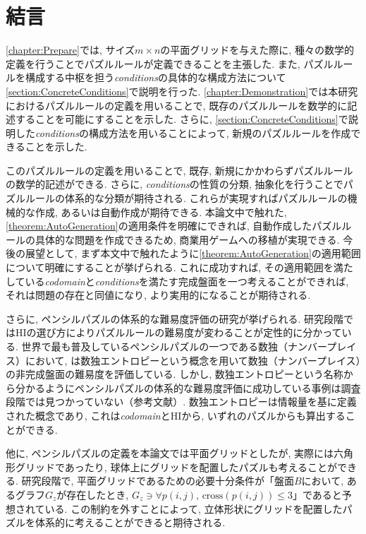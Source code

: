\chapter{結言}
\cref{chapter:Prepare}では, サイズ$m\times n$の平面グリッドを与えた際に, 種々の数学的定義を行うことでパズルルールが定義できることを主張した. また, パズルルールを構成する中枢を担う\textit{conditions}の具体的な構成方法について\cref{section:ConcreteConditions}で説明を行った. \cref{chapter:Demonstration}では本研究におけるパズルルールの定義を用いることで, 既存のパズルルールを数学的に記述することを可能にすることを示した. さらに, \cref{section:ConcreteConditions}で説明した\textit{conditions}の構成方法を用いることによって, 新規のパズルルールを作成できることを示した.

このパズルルールの定義を用いることで, 既存, 新規にかかわらずパズルルールの数学的記述ができる. さらに, \textit{conditions}の性質の分類, 抽象化を行うことでパズルルールの体系的な分類が期待される. これらが実現すればパズルルールの機械的な作成, あるいは自動作成が期待できる. 本論文中で触れた, \cref{theorem:AutoGeneration}の適用条件を明確にできれば, 自動作成したパズルルールの具体的な問題を作成できるため, 商業用ゲームへの移植が実現できる.
今後の展望として, まず本文中で触れたように\cref{theorem:AutoGeneration}の適用範囲について明確にすることが挙げられる. これに成功すれば, その適用範囲を満たしている\textit{codomain}と\textit{conditions}を満たす完成盤面を一つ考えることができれば, それは問題の存在と同値になり, より実用的になることが期待される.

さらに, ペンシルパズルの体系的な難易度評価の研究が挙げられる. 研究段階ではHIの選び方によりパズルルールの難易度が変わることが定性的に分かっている. 世界で最も普及しているペンシルパズルの一つである数独（ナンバープレイス）において, \cite{Chen2009}は数独エントロピーという概念を用いて数独（ナンバープレイス）の非完成盤面の難易度を評価している. しかし, 数独エントロピーという名称から分かるようにペンシルパズルの体系的な難易度評価に成功している事例は調査段階では見つかっていない（参考文献）. 数独エントロピーは情報量を基に定義された概念であり, これは\textit{codomain}とHIから, いずれのパズルからも算出することができる.

他に, ペンシルパズルの定義を本論文では平面グリッドとしたが, 実際には六角形グリッドであったり, 球体上にグリッドを配置したパズルも考えることができる. 研究段階で, 平面グリッドであるための必要十分条件が「盤面$B$において, あるグラフ$G_z$が存在したとき, $G_z \ni \forall p(i,j)$, $\text{cross}(p(i,j))\le3$」であると予想されている. この制約を外すことによって, 立体形状にグリッドを配置したパズルを体系的に考えることができると期待される.